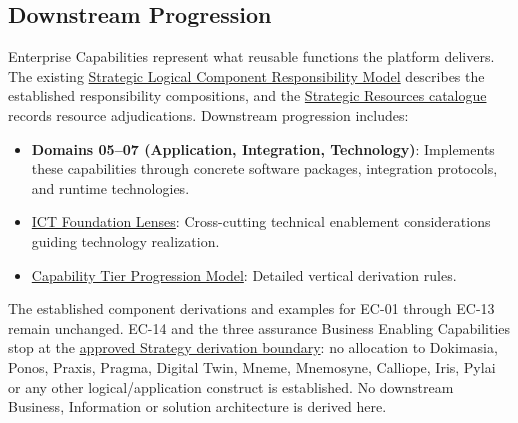 \par\smallskip
{}\label{rad:enterprise:317}
\subsection*{Downstream Progression}
\label{rad:enterprise:319}

Enterprise Capabilities represent what reusable functions the platform delivers. The existing \href{https://github.com/fhirfactory/harmonia/blob/98410db60155198a75f74c79d98060070209faa1/docs/markdown/02-strategy/strategic-views/logical-component-responsibilities.md}{Strategic Logical Component Responsibility Model} describes the established responsibility compositions, and the \href{https://github.com/fhirfactory/harmonia/blob/98410db60155198a75f74c79d98060070209faa1/docs/markdown/02-strategy/resources/strategic-resources.md}{Strategic Resources catalogue} records resource adjudications. Downstream progression includes:

\label{rad:enterprise:320}

\begin{itemize}

\item 
\textbf{Domains 05–07 (Application, Integration, Technology)}: Implements these capabilities through concrete software packages, integration protocols, and runtime technologies.



\item 
\href{https://github.com/fhirfactory/harmonia/blob/98410db60155198a75f74c79d98060070209faa1/docs/markdown/02-strategy/capabilities/ict-foundation-lenses.md}{ICT Foundation Lenses}: Cross-cutting technical enablement considerations guiding technology realization.



\item 
\hyperref[rad:tier-model]{Capability Tier Progression Model}: Detailed vertical derivation rules.



\end{itemize}
\label{rad:enterprise:324}

The established component derivations and examples for EC-01 through EC-13 remain unchanged. EC-14 and the three assurance Business Enabling Capabilities stop at the \hyperref[rad:assurance-strategy:88]{approved Strategy derivation boundary}: no allocation to Dokimasia, Ponos, Praxis, Pragma, Digital Twin, Mneme, Mnemosyne, Calliope, Iris, Pylai or any other logical/\allowbreak{}application construct is established. No downstream Business, Information or solution architecture is derived here.

